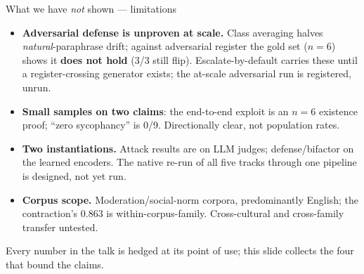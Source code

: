 \documentclass[aspectratio=169,11pt]{beamer}
\newcommand{\hi}[1]{\textcolor{cbblue}{\textbf{#1}}}
\newcommand{\gold}[1]{\textcolor{cborange}{\textbf{#1}}}
\begin{document}
\begin{frame}{What we have \emph{not} shown --- limitations}
\begin{itemize}
  \item \small \hi{Adversarial defense is unproven at scale.} Class averaging halves \emph{natural}-paraphrase drift; against adversarial register the gold set ($n{=}6$) shows it \gold{does not hold} (3/3 still flip). Escalate-by-default carries these until a register-crossing generator exists; the at-scale adversarial run is registered, unrun.
  \item \small \hi{Small samples on two claims}: the end-to-end exploit is an $n{=}6$ existence proof; ``zero sycophancy'' is 0/9. Directionally clear, not population rates.
  \item \small \hi{Two instantiations.} Attack results are on LLM judges; defense/bifactor on the learned encoders. The native re-run of all five tracks through one pipeline is designed, not yet run.
  \item \small \hi{Corpus scope.} Moderation/social-norm corpora, predominantly English; the contraction's 0.863 is within-corpus-family. Cross-cultural and cross-family transfer untested.
\end{itemize}
\vfill
{\scriptsize Every number in the talk is hedged at its point of use; this slide collects the four that bound the claims.}
\end{frame}
\end{document}

